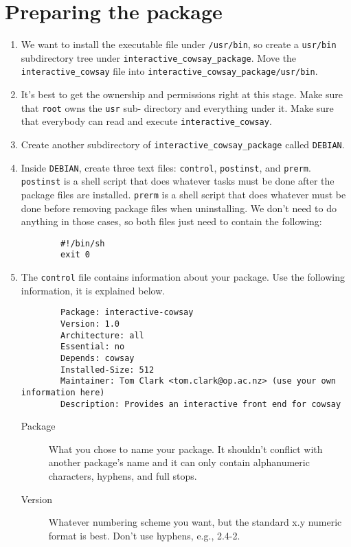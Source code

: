 \documentclass{article}
\begin{document}
\section{Preparing the package}
\begin{enumerate}
	\item We want to install the executable file under \texttt{/usr/bin}, so create a \texttt{usr/bin} subdirectory tree under
		\texttt{interactive\_cowsay\_package}. Move the \texttt{interactive\_cowsay} file into \texttt{interactive\_cowsay\_package/usr/bin}.
	\item It's best to get the ownership and permissions right at this stage. Make sure that \texttt{root} owns the \texttt{usr} sub-
		directory and everything under it. Make sure that everybody can read and execute \texttt{interactive\_cowsay}.
	\item Create another subdirectory of \texttt{interactive\_cowsay\_package} called \texttt{DEBIAN}.
	\item Inside \texttt{DEBIAN}, create three text files: \texttt{control}, \texttt{postinst}, and \texttt{prerm}.
		\texttt{postinst} is a shell script that does whatever tasks must be done after the package files are installed.
		\texttt{prerm} is a shell script that does whatever must be done before removing package files when uninstalling.
		We don't need to do anything in those cases, so both files just need to contain the following:

		\begin{verbatim}
		#!/bin/sh
		exit 0
		\end{verbatim}
\newpage

	\item The \texttt{control} file contains information about your package. Use the following information, it is explained below.
		\begin{verbatim}
		Package: interactive-cowsay
		Version: 1.0
		Architecture: all
		Essential: no
		Depends: cowsay
		Installed-Size: 512
		Maintainer: Tom Clark <tom.clark@op.ac.nz> (use your own information here)
		Description: Provides an interactive front end for cowsay
		\end{verbatim}

		\begin{description}
			\item[Package]What you chose to name your package. It shouldn't conflict with another package's name and it can only contain alphanumeric characters, hyphens, and full stops.
                        \item[Version]Whatever numbering scheme you want, but the standard x.y numeric format is best. Don't use hyphens, e.g., 2.4-2.


\end{description}
\end{enumerate}
\end{document}
